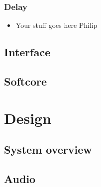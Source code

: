 \documentclass[12p]{article}
\begin{document}
\subsubsection{Delay}
\begin{itemize}
\item Your stuff goes here Philip
\end{itemize}

\subsection{Interface}
\label{Theory:Interface}

\subsection{Softcore}
\label{Theory:Softcore}


\newpage
\section{Design}
\label{Design}
\subsection{System overview}
\label{Design:SystemOverview}

\subsection{Audio}
\label{Design:Audio}
\end{document}
